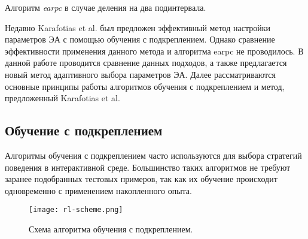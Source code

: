 \begin{algorithm}[h!]
    \caption{Алгоритм \textit{earpc} в случае деления на два подинтервала.}
    \label{earpc_scheme}
    \begin{algorithmic}[1]
	      \ENDIF
	    \ENDFOR
	\ENDFOR
    \end{algorithmic}
\end{algorithm}

Недавно Karafotias et al. был предложен эффективный метод настройки параметров ЭА с помощью обучения с подкреплением. Однако сравнение эффективности применения данного метода и алгоритма earpc не проводилось. В данной работе проводится сравнение данных подходов, а также предлагается новый метод адаптивного выбора параметров ЭА. Далее рассматриваются  основные принципы работы алгоритмов обучения с подкреплением и метод, предложенный Karafotias et al.

\subsection{Обучение с подкреплением}
\label{rl}
Алгоритмы обучения с подкреплением часто используются для выбора стратегий поведения в интерактивной среде. Большинство таких алгоритмов не требуют заранее подобранных тестовых примеров, так как их обучение происходит одновременно с применением накопленного опыта.

\begin{figure}
    \centering
    \texttt{[image: rl-scheme.png]}
    \caption{Схема алгоритма обучения с подкреплением.}
    \label{rl_scheme}
\end{figure}

